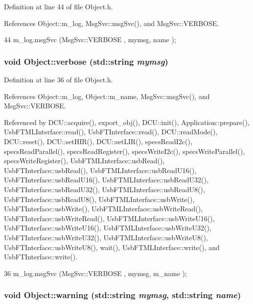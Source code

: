 Definition at line 44 of file Object.h.

References Object::m\_\-log, MsgSvc::msgSvc(), and MsgSvc::VERBOSE.


\begin{DoxyCode}
44 { m_log.msgSvc (MsgSvc::VERBOSE , mymsg, name ); }
\end{DoxyCode}
\hypertarget{classObject_a83d2db2df682907ea1115ad721c1c4a1}{
\subsubsection[{verbose}]{\setlength{\rightskip}{0pt plus 5cm}void Object::verbose (std::string {\em mymsg})}}
\label{classObject_a83d2db2df682907ea1115ad721c1c4a1}


Definition at line 36 of file Object.h.

References Object::m\_\-log, Object::m\_\-name, MsgSvc::msgSvc(), and MsgSvc::VERBOSE.

Referenced by DCU::acquire(), export\_\-obj(), DCU::init(), Application::prepare(), UsbFTMLInterface::read(), UsbFTInterface::read(), DCU::readMode(), DCU::reset(), DCU::setHIR(), DCU::setLIR(), specsReadI2c(), specsReadParallel(), specsReadRegister(), specsWriteI2c(), specsWriteParallel(), specsWriteRegister(), UsbFTMLInterface::usbRead(), UsbFTInterface::usbRead(), UsbFTMLInterface::usbReadU16(), UsbFTInterface::usbReadU16(), UsbFTMLInterface::usbReadU32(), UsbFTInterface::usbReadU32(), UsbFTMLInterface::usbReadU8(), UsbFTInterface::usbReadU8(), UsbFTMLInterface::usbWrite(), UsbFTInterface::usbWrite(), UsbFTMLInterface::usbWriteRead(), UsbFTInterface::usbWriteRead(), UsbFTMLInterface::usbWriteU16(), UsbFTInterface::usbWriteU16(), UsbFTMLInterface::usbWriteU32(), UsbFTInterface::usbWriteU32(), UsbFTMLInterface::usbWriteU8(), UsbFTInterface::usbWriteU8(), wait(), UsbFTMLInterface::write(), and UsbFTInterface::write().


\begin{DoxyCode}
36 { m_log.msgSvc (MsgSvc::VERBOSE , mymsg, m_name ); }
\end{DoxyCode}
\hypertarget{classObject_a11f101db4dd73d9391b0231818881d86}{
\subsubsection[{warning}]{\setlength{\rightskip}{0pt plus 5cm}void Object::warning (std::string {\em mymsg}, \/  std::string {\em name})}}
\label{classObject_a11f101db4dd73d9391b0231818881d86}


